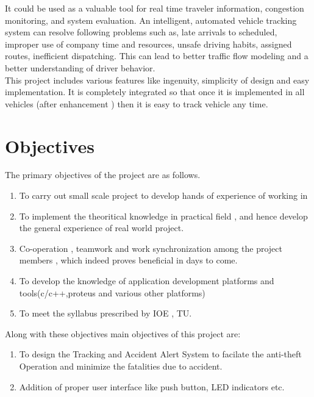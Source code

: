 \documentclass[11pt,a4paper]{article}
\begin{document}
 It could be used as a valuable tool for real time traveler information, congestion monitoring, and system evaluation. An intelligent, automated vehicle tracking system can resolve following problems such as, late arrivals to scheduled, improper use of company time and resources, unsafe driving habits, assigned routes, inefficient dispatching. This can lead to better traffic flow modeling and a better understanding of driver behavior. \\
 
 This project includes various features like ingenuity, simplicity of design and easy implementation. It is completely  integrated so that once it is implemented in all vehicles (after enhancement ) then it is easy to track vehicle any time. 


\section{Objectives}
The primary objectives of the project are as follows.
\begin{enumerate} 
   \item To carry out small scale project to develop hands of experience of working  in
  \item To implement the theoritical knowledge in practical field , and hence develop      
        the general experience of real world project.
   \item Co-operation , teamwork and work synchronization among the project 
       members , which indeed proves beneficial in days to come.
   \item To develop the knowledge of application development platforms and 
        tools(c/c++,proteus and various other platforms)
   \item To meet the syllabus prescribed by IOE , TU.
\end{enumerate}
Along with these objectives main objectives of this project are:
\begin{enumerate}

   \item To design the Tracking and Accident Alert System to facilate the anti-theft Operation and minimize the fatalities due to accident.
  \item Addition of proper user interface like push button, LED indicators etc.

\end{enumerate}
\newpage
\end{document}

